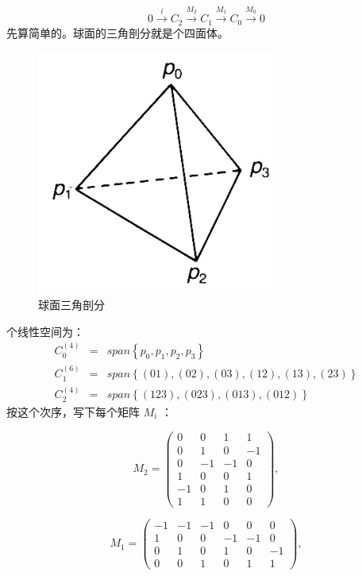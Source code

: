 \documentclass[UTF8]{ctexart}
\begin{document}
\begin{equation}
0\stackrel{i}{\longrightarrow}C_{2}\stackrel{M_{2}}{\longrightarrow}C_{1}\stackrel{M_{1}}{\longrightarrow}C_{0}\stackrel{M_{0}}{\longrightarrow}0
\end{equation}
\noindent
先算简单的。球面的三角剖分就是个四面体。
\begin{figure}[H]
\begin{centering}
\includegraphics[width=8cm]{include/f1}
\par\end{centering}
\caption{球面三角剖分}

\end{figure}
 个线性空间为：
\begin{eqnarray}
C_{0}^{(4)} & = & span\left\{ p_{0},p_{1},p_{2},p_{3}\right\} \\
C_{1}^{(6)} & = & span\left\{ (01),(02),(03),(12),(13),(23)\right\} \\
C_{2}^{(4)} & = & span\left\{ (123),(023),(013),(012)\right\} 
\end{eqnarray}
按这个次序，写下每个矩阵 $M_{i}$ ：

\begin{equation}
M_{2}=\left(\begin{array}{cccc}
0 & 0 & 1 & 1\\
0 & 1 & 0 & -1\\
0 & -1 & -1 & 0\\
1 & 0 & 0 & 1\\
-1 & 0 & 1 & 0\\
1 & 1 & 0 & 0
\end{array}\right),
\end{equation}

\begin{equation}
M_{1}=\left(\begin{array}{cccccc}
-1 & -1 & -1 & 0 & 0 & 0\\
1 & 0 & 0 & -1 & -1 & 0\\
0 & 1 & 0 & 1 & 0 & -1\\
0 & 0 & 1 & 0 & 1 & 1
\end{array}\right),
\end{equation}
\end{document}
